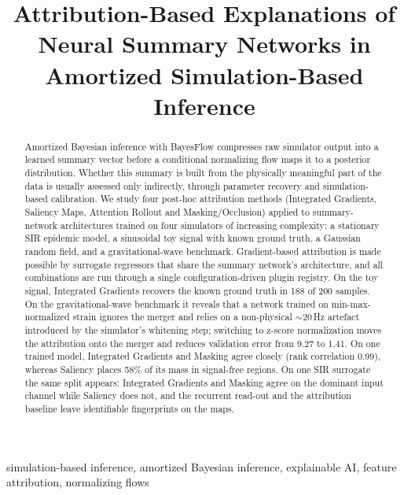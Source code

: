 \documentclass[conference]{IEEEtran}
\begin{document}
\title{Attribution-Based Explanations of Neural Summary Networks in Amortized Simulation-Based Inference}

\author{
}

\maketitle

\begin{abstract}
Amortized Bayesian inference with BayesFlow compresses raw simulator output into a learned summary vector
before a conditional normalizing flow maps it to a posterior distribution. Whether this summary is built from
the physically meaningful part of the data is usually assessed only indirectly, through parameter recovery and
simulation-based calibration. We study four post-hoc attribution methods (Integrated Gradients, Saliency
Maps, Attention Rollout and Masking/Occlusion) applied to summary-network architectures trained on four
simulators of increasing complexity: a stationary SIR epidemic model, a sinusoidal toy signal with known
ground truth, a Gaussian random field, and a gravitational-wave benchmark. Gradient-based attribution is made
possible by surrogate regressors that share the summary network's architecture, and all combinations are run
through a single configuration-driven plugin registry. On the toy signal, Integrated Gradients recovers the
known ground truth in 188 of 200 samples. On the gravitational-wave benchmark it reveals that a network
trained on min-max-normalized strain ignores the merger and relies on a non-physical ${\sim}20$\,Hz artefact
introduced by the simulator's whitening step; switching to z-score normalization moves the attribution onto
the merger and reduces validation error from 9.27 to 1.41. On one trained model, Integrated Gradients and
Masking agree closely (rank correlation 0.99), whereas Saliency places 58\% of its mass in signal-free regions.
On one SIR surrogate the same split appears: Integrated Gradients and Masking agree on the dominant input
channel while Saliency does not, and the recurrent read-out and the attribution baseline leave identifiable
fingerprints on the maps.
\end{abstract}

\begin{IEEEkeywords}
simulation-based inference, amortized Bayesian inference, explainable AI, feature attribution, normalizing flows
\end{IEEEkeywords}
\end{document}
